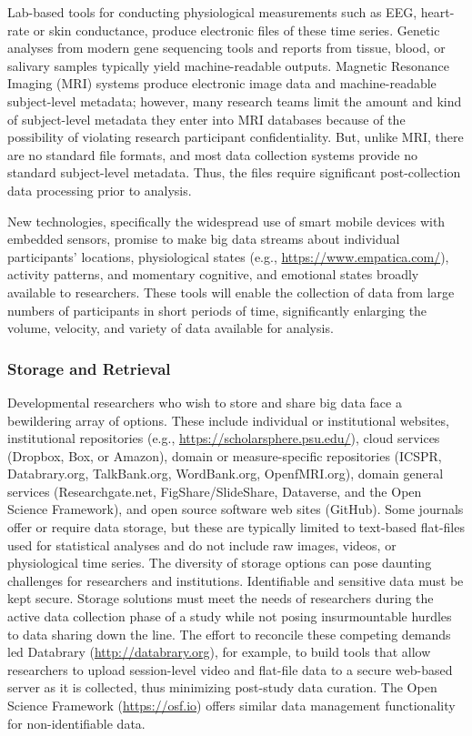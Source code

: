 \documentclass[letterpaper,man,apacite,natbib]{apa6}
\begin{document}
Lab-based tools for conducting physiological measurements such as EEG, heart-rate or skin conductance, produce electronic files of these time series.
Genetic analyses from modern gene sequencing tools and reports from tissue, blood, or salivary samples typically yield machine-readable outputs.
Magnetic Resonance Imaging (MRI) systems produce electronic image data and machine-readable subject-level metadata; however, many research teams limit the amount and kind of subject-level metadata they enter into MRI databases because of the possibility of violating research participant confidentiality.
But, unlike MRI, there are no standard file formats, and most data collection systems provide no standard subject-level metadata.
Thus, the files require significant post-collection data processing prior to analysis. 

New technologies, specifically the widespread use of smart mobile devices with embedded sensors, promise to make big data streams about individual participants' locations, physiological states (e.g., \url{https://www.empatica.com/}), activity patterns, and momentary cognitive, and emotional states broadly available to researchers.
These tools will enable the collection of data from large numbers of participants in short periods of time, significantly enlarging the volume, velocity, and variety of data available for analysis.   

\subsubsection{Storage and Retrieval}

Developmental researchers who wish to store and share big data face a bewildering array of options.
These include individual or institutional websites, institutional repositories (e.g., \url{https://scholarsphere.psu.edu/}), cloud services (Dropbox, Box, or Amazon), domain or measure-specific repositories (ICSPR, Databrary.org, TalkBank.org, WordBank.org, OpenfMRI.org), domain general services (Researchgate.net, FigShare/SlideShare, Dataverse, and the Open Science Framework), and open source software web sites (GitHub).
Some journals offer or require data storage, but these are typically limited to text-based flat-files used for statistical analyses and do not include raw images, videos, or physiological time series.
The diversity of storage options can pose daunting challenges for researchers and institutions.
Identifiable and sensitive data must be kept secure.
Storage solutions must meet the needs of researchers during the active data collection phase of a study while not posing insurmountable hurdles to data sharing down the line.
The effort to reconcile these competing demands led Databrary (\url{http://databrary.org}), for example, to build tools that allow researchers to upload session-level video and flat-file data to a secure web-based server as it is collected, thus minimizing post-study data curation.
The Open Science Framework (\url{https://osf.io}) offers similar data management functionality for non-identifiable data.
\end{document}
